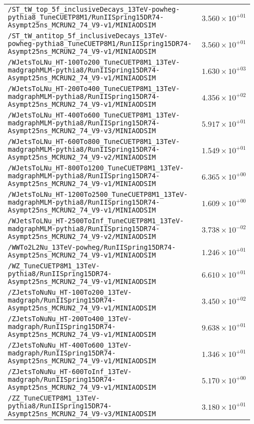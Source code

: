 \begin{center}
\begin{tabular}{ll}
\verb!/ST_tW_top_5f_inclusiveDecays_13TeV-powheg-pythia8_TuneCUETP8M1/RunIISpring15DR74-Asympt25ns_MCRUN2_74_V9-v1/MINIAODSIM! &$3.560\times 10^{+01}$\tabularnewline
\verb!/ST_tW_antitop_5f_inclusiveDecays_13TeV-powheg-pythia8_TuneCUETP8M1/RunIISpring15DR74-Asympt25ns_MCRUN2_74_V9-v1/MINIAODSIM! &$3.560\times 10^{+01}$\tabularnewline
\verb!/WJetsToLNu_HT-100To200_TuneCUETP8M1_13TeV-madgraphMLM-pythia8/RunIISpring15DR74-Asympt25ns_MCRUN2_74_V9-v1/MINIAODSIM! &$1.630\times 10^{+03}$\tabularnewline
\verb!/WJetsToLNu_HT-200To400_TuneCUETP8M1_13TeV-madgraphMLM-pythia8/RunIISpring15DR74-Asympt25ns_MCRUN2_74_V9-v1/MINIAODSIM! &$4.356\times 10^{+02}$\tabularnewline
\verb!/WJetsToLNu_HT-400To600_TuneCUETP8M1_13TeV-madgraphMLM-pythia8/RunIISpring15DR74-Asympt25ns_MCRUN2_74_V9-v3/MINIAODSIM! &$5.917\times 10^{+01}$\tabularnewline
\verb!/WJetsToLNu_HT-600To800_TuneCUETP8M1_13TeV-madgraphMLM-pythia8/RunIISpring15DR74-Asympt25ns_MCRUN2_74_V9-v2/MINIAODSIM! &$1.549\times 10^{+01}$\tabularnewline
\verb!/WJetsToLNu_HT-800To1200_TuneCUETP8M1_13TeV-madgraphMLM-pythia8/RunIISpring15DR74-Asympt25ns_MCRUN2_74_V9-v1/MINIAODSIM! &$6.365\times 10^{+00}$\tabularnewline
\verb!/WJetsToLNu_HT-1200To2500_TuneCUETP8M1_13TeV-madgraphMLM-pythia8/RunIISpring15DR74-Asympt25ns_MCRUN2_74_V9-v1/MINIAODSIM! &$1.609\times 10^{+00}$\tabularnewline
\verb!/WJetsToLNu_HT-2500ToInf_TuneCUETP8M1_13TeV-madgraphMLM-pythia8/RunIISpring15DR74-Asympt25ns_MCRUN2_74_V9-v2/MINIAODSIM! &$3.738\times 10^{-02}$\tabularnewline
\verb!/WWTo2L2Nu_13TeV-powheg/RunIISpring15DR74-Asympt25ns_MCRUN2_74_V9-v1/MINIAODSIM! &$1.246\times 10^{+01}$\tabularnewline
\verb!/WZ_TuneCUETP8M1_13TeV-pythia8/RunIISpring15DR74-Asympt25ns_MCRUN2_74_V9-v1/MINIAODSIM! &$6.610\times 10^{+01}$\tabularnewline
\verb!/ZJetsToNuNu_HT-100To200_13TeV-madgraph/RunIISpring15DR74-Asympt25ns_MCRUN2_74_V9-v1/MINIAODSIM! &$3.450\times 10^{+02}$\tabularnewline
\verb!/ZJetsToNuNu_HT-200To400_13TeV-madgraph/RunIISpring15DR74-Asympt25ns_MCRUN2_74_V9-v1/MINIAODSIM! &$9.638\times 10^{+01}$\tabularnewline
\verb!/ZJetsToNuNu_HT-400To600_13TeV-madgraph/RunIISpring15DR74-Asympt25ns_MCRUN2_74_V9-v1/MINIAODSIM! &$1.346\times 10^{+01}$\tabularnewline
\verb!/ZJetsToNuNu_HT-600ToInf_13TeV-madgraph/RunIISpring15DR74-Asympt25ns_MCRUN2_74_V9-v1/MINIAODSIM! &$5.170\times 10^{+00}$\tabularnewline
\verb!/ZZ_TuneCUETP8M1_13TeV-pythia8/RunIISpring15DR74-Asympt25ns_MCRUN2_74_V9-v3/MINIAODSIM! &$3.180\times 10^{+01}$\tabularnewline
\hline
\end{tabular}\end{center}
